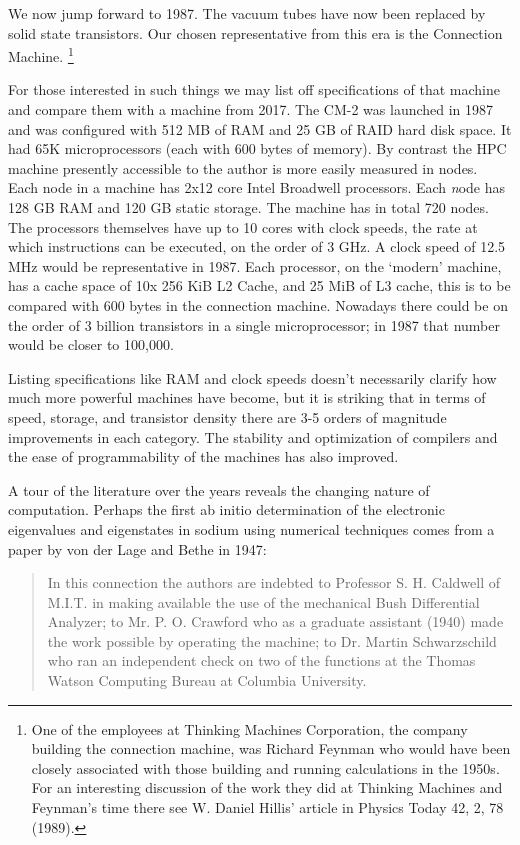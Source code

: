 We now jump forward to 1987. The vacuum tubes have
now been replaced by solid state transistors. Our chosen 
representative from this era is the Connection Machine.
\footnote{One of the employees at Thinking Machines Corporation,
the company building the connection machine, was Richard Feynman
who would have been closely associated with those building and running
calculations in the 1950s. For an interesting discussion of the work they
did at Thinking Machines and Feynman's time there see W. Daniel
Hillis' article in Physics Today 42, 2, 78 (1989).}

For those interested in such things we may list off specifications of 
that machine and compare them with a machine from 2017. The 
CM-2 was launched in 1987 and was configured with 512 MB of RAM and 25 GB of RAID
hard disk space. It had 65K microprocessors (each with 600 bytes of memory). 
By contrast the HPC machine presently accessible to the author 
is more easily measured in nodes. Each node in a machine has 2x12 core Intel Broadwell processors.
Each {\emph node} has 128 GB RAM and 120 GB static storage. The machine has in total 720 nodes. 
The processors themselves have up to 10 cores with clock speeds, the rate at which 
instructions can be executed, on the order of 3 GHz. A clock speed of 12.5 MHz 
would be representative in 1987. 
Each processor, on the `modern' machine, has a cache 
space of 10x 256 KiB L2 Cache, and 25 MiB of L3 cache,
this is to be compared with 600 bytes in the connection machine. 
Nowadays there could be on the order of 3 billion transistors in a 
single microprocessor; in 1987 that number would be closer to 100,000. 

Listing specifications like RAM and clock speeds doesn't necessarily clarify 
how much more powerful machines have become, 
but it is striking that in terms of speed, storage, and transistor density 
there are 3-5 orders of magnitude improvements in each category. 
The stability and optimization of compilers and the ease of programmability
of the machines has also improved.

A tour of the literature over the years reveals the changing nature of computation.
Perhaps the first ab initio determination of the electronic eigenvalues and eigenstates
in sodium using numerical techniques comes from a paper by von der Lage and Bethe in 1947:
%
\begin{quote}
In this connection the authors are indebted to Professor S. H. Caldwell of M.I.T. in making available the
use of the mechanical Bush Differential Analyzer; to Mr. P. O. Crawford who as a graduate assistant (1940)
made the work possible by operating the machine; to Dr. Martin Schwarzschild who ran an independent
check on two of the functions at the Thomas Watson Computing Bureau at Columbia University.
\end{quote}
%

